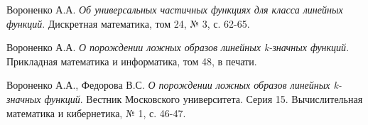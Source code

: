 \documentclass[oneside,final,14pt]{extreport}
\begin{document}
\begin{thebibliography}{0}

 Вороненко А.А. \emph{Об универсальных частичных функциях для класса линейных функций}. 
Дискретная математика, том 24, № 3, с. 62-65.
 
 Вороненко А.А. \emph{О порождении ложных образов линейных k-значных функций}. 
Прикладная математика и информатика, том 48, в печати.

 Вороненко А.А., Федорова В.С. \emph{О порождении ложных образов линейных k-значных функций}.
Вестник Московского университета. Серия 15. Вычислительная математика и кибернетика, № 1, с. 46-47.

\end{thebibliography}
\end{document}
